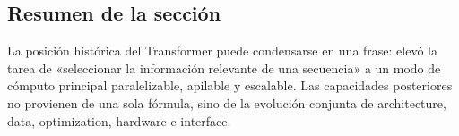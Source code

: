 \subsection{Resumen de la sección}

La posición histórica del Transformer puede condensarse en una frase: elevó la tarea de «seleccionar la información relevante de una secuencia» a un modo de cómputo principal paralelizable, apilable y escalable. Las capacidades posteriores no provienen de una sola fórmula, sino de la evolución conjunta de architecture, data, optimization, hardware e interface.
